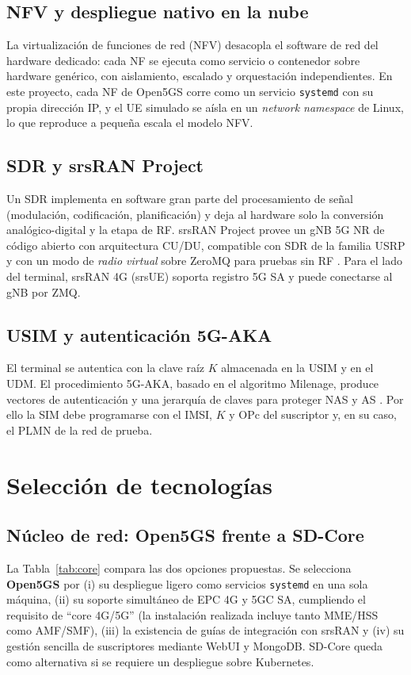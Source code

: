 \documentclass[conference]{IEEEtran}
\begin{document}
\subsection{NFV y despliegue nativo en la nube}
La virtualización de funciones de red (NFV) desacopla el software de red del hardware dedicado: cada NF se ejecuta como servicio o contenedor sobre hardware genérico, con aislamiento, escalado y orquestación independientes. En este proyecto, cada NF de Open5GS corre como un servicio \texttt{systemd} con su propia dirección IP, y el UE simulado se aísla en un \textit{network namespace} de Linux, lo que reproduce a pequeña escala el modelo NFV.

\subsection{SDR y srsRAN Project}
Un SDR implementa en software gran parte del procesamiento de señal (modulación, codificación, planificación) y deja al hardware solo la conversión analógico-digital y la etapa de RF. srsRAN Project provee un gNB 5G NR de código abierto con arquitectura CU/DU, compatible con SDR de la familia USRP y con un modo de \textit{radio virtual} sobre ZeroMQ para pruebas sin RF \cite{srsran,zeromq}. Para el lado del terminal, srsRAN 4G (srsUE) soporta registro 5G SA y puede conectarse al gNB por ZMQ.

\subsection{USIM y autenticación 5G-AKA}
El terminal se autentica con la clave raíz $K$ almacenada en la USIM y en el UDM. El procedimiento 5G-AKA, basado en el algoritmo Milenage, produce vectores de autenticación y una jerarquía de claves para proteger NAS y AS \cite{ts33501,milenage}. Por ello la SIM debe programarse con el IMSI, $K$ y OPc del suscriptor y, en su caso, el PLMN de la red de prueba.

\section{Selección de tecnologías}
\label{sec:tec}

\subsection{Núcleo de red: Open5GS frente a SD-Core}
La Tabla~\ref{tab:core} compara las dos opciones propuestas. Se selecciona \textbf{Open5GS} por (i) su despliegue ligero como servicios \texttt{systemd} en una sola máquina, (ii) su soporte simultáneo de EPC 4G y 5GC SA, cumpliendo el requisito de ``core 4G/5G'' (la instalación realizada incluye tanto MME/HSS como AMF/SMF), (iii) la existencia de guías de integración con srsRAN y (iv) su gestión sencilla de suscriptores mediante WebUI y MongoDB. SD-Core queda como alternativa si se requiere un despliegue sobre Kubernetes.
\end{document}
